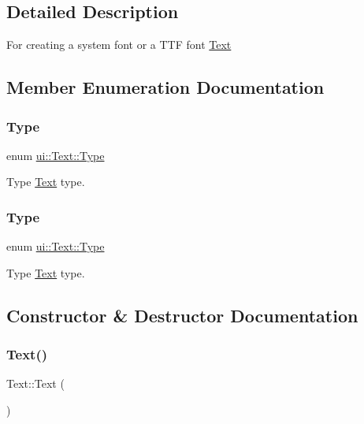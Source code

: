 \subsection{Detailed Description}
For creating a system font or a T\+TF font \hyperlink{classui_1_1Text}{Text} 

\subsection{Member Enumeration Documentation}
\mbox{\label{classui_1_1Text_a66074a2bf4b155f85115f944c6ff01ed}} 
\subsubsection{\texorpdfstring{Type}{Type}\hspace{0.1cm}{\footnotesize\ttfamily [1/2]}}
{\footnotesize\ttfamily enum \hyperlink{classui_1_1Text_a66074a2bf4b155f85115f944c6ff01ed}{ui\+::\+Text\+::\+Type}\hspace{0.3cm}{\ttfamily [strong]}}

Type \hyperlink{classui_1_1Text}{Text} type. \mbox{\label{classui_1_1Text_a66074a2bf4b155f85115f944c6ff01ed}} 
\subsubsection{\texorpdfstring{Type}{Type}\hspace{0.1cm}{\footnotesize\ttfamily [2/2]}}
{\footnotesize\ttfamily enum \hyperlink{classui_1_1Text_a66074a2bf4b155f85115f944c6ff01ed}{ui\+::\+Text\+::\+Type}\hspace{0.3cm}{\ttfamily [strong]}}

Type \hyperlink{classui_1_1Text}{Text} type. 

\subsection{Constructor \& Destructor Documentation}
\mbox{\label{classui_1_1Text_ab3e26143fccc52699bcc5149cae852bc}} 
\subsubsection{\texorpdfstring{Text()}{Text()}\hspace{0.1cm}{\footnotesize\ttfamily [1/2]}}
{\footnotesize\ttfamily Text\+::\+Text (\begin{DoxyParamCaption}{ }\end{DoxyParamCaption})}


